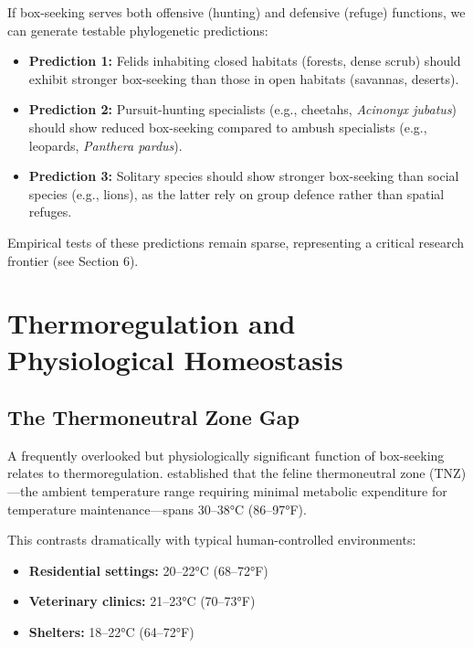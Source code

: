 \documentclass[12pt,a4paper]{article}
\begin{document}
If box-seeking serves both offensive (hunting) and defensive (refuge) functions, we can generate testable phylogenetic predictions:

\begin{itemize}
    \item \textbf{Prediction 1:} Felids inhabiting closed habitats (forests, dense scrub) should exhibit stronger box-seeking than those in open habitats (savannas, deserts).
    
    \item \textbf{Prediction 2:} Pursuit-hunting specialists (e.g., cheetahs, \textit{Acinonyx jubatus}) should show reduced box-seeking compared to ambush specialists (e.g., leopards, \textit{Panthera pardus}).
    
    \item \textbf{Prediction 3:} Solitary species should show stronger box-seeking than social species (e.g., lions), as the latter rely on group defence rather than spatial refuges.
\end{itemize}

Empirical tests of these predictions remain sparse, representing a critical research frontier (see Section 6).

\section{Thermoregulation and Physiological Homeostasis}

\subsection{The Thermoneutral Zone Gap}

A frequently overlooked but physiologically significant function of box-seeking relates to thermoregulation. \citet{NRC2006} established that the feline thermoneutral zone (TNZ)—the ambient temperature range requiring minimal metabolic expenditure for temperature maintenance—spans 30–38°C (86–97°F).

This contrasts dramatically with typical human-controlled environments:

\begin{itemize}
    \item \textbf{Residential settings:} 20–22°C (68–72°F)
    \item \textbf{Veterinary clinics:} 21–23°C (70–73°F)  
    \item \textbf{Shelters:} 18–22°C (64–72°F)
\end{itemize}
\end{document}
